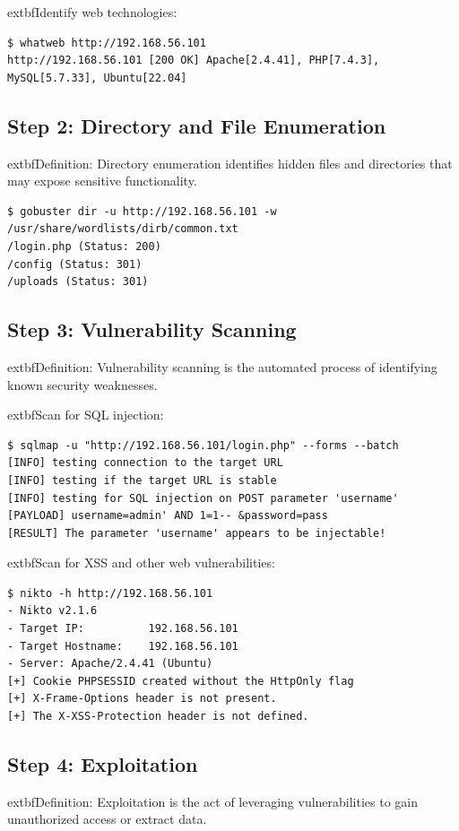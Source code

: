 	extbf{Identify web technologies:}
\begin{verbatim}
$ whatweb http://192.168.56.101
http://192.168.56.101 [200 OK] Apache[2.4.41], PHP[7.4.3], MySQL[5.7.33], Ubuntu[22.04]
\end{verbatim}

\subsection*{Step 2: Directory and File Enumeration}
	extbf{Definition:} Directory enumeration identifies hidden files and directories that may expose sensitive functionality\cite{owasp}.
\begin{verbatim}
$ gobuster dir -u http://192.168.56.101 -w /usr/share/wordlists/dirb/common.txt
/login.php (Status: 200)
/config (Status: 301)
/uploads (Status: 301)
\end{verbatim}

\subsection*{Step 3: Vulnerability Scanning}
	extbf{Definition:} Vulnerability scanning is the automated process of identifying known security weaknesses\cite{nist800154}.

	extbf{Scan for SQL injection:}
\begin{verbatim}
$ sqlmap -u "http://192.168.56.101/login.php" --forms --batch
[INFO] testing connection to the target URL
[INFO] testing if the target URL is stable
[INFO] testing for SQL injection on POST parameter 'username'
[PAYLOAD] username=admin' AND 1=1-- &password=pass
[RESULT] The parameter 'username' appears to be injectable!
\end{verbatim}

	extbf{Scan for XSS and other web vulnerabilities:}
\begin{verbatim}
$ nikto -h http://192.168.56.101
- Nikto v2.1.6
- Target IP:          192.168.56.101
- Target Hostname:    192.168.56.101
- Server: Apache/2.4.41 (Ubuntu)
[+] Cookie PHPSESSID created without the HttpOnly flag
[+] X-Frame-Options header is not present.
[+] The X-XSS-Protection header is not defined.
\end{verbatim}

\subsection*{Step 4: Exploitation}
	extbf{Definition:} Exploitation is the act of leveraging vulnerabilities to gain unauthorized access or extract data\cite{shostack2014}.

